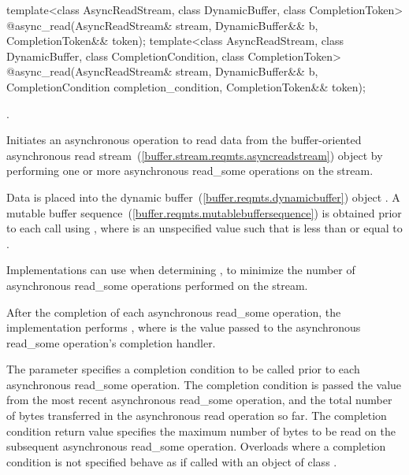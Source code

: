 %
\begin{itemdecl}
template<class AsyncReadStream, class DynamicBuffer, class CompletionToken>
    @\DEDUCED@ async_read(AsyncReadStream& stream,
                       DynamicBuffer&& b, CompletionToken&& token);
template<class AsyncReadStream, class DynamicBuffer, class CompletionCondition,
         class CompletionToken>
    @\DEDUCED@ async_read(AsyncReadStream& stream,
                       DynamicBuffer&& b,
                       CompletionCondition completion_condition,
                       CompletionToken&& token);
\end{itemdecl}

\begin{itemdescr}
\pnum
\completionsig {}.

\pnum
\effects Initiates an asynchronous operation to read data from the buffer-oriented asynchronous read stream~(\ref{buffer.stream.reqmts.asyncreadstream}) object  by performing one or more asynchronous read_some operations on the stream.

\pnum
Data is placed into the dynamic buffer~(\ref{buffer.reqmts.dynamicbuffer}) object . A mutable buffer sequence~(\ref{buffer.reqmts.mutablebuffersequence}) is obtained prior to each  call using , where  is an unspecified value such that  is less than or equal to . \begin{note} Implementations can use  when determining , to minimize the number of asynchronous read_some operations performed on the stream. \end{note} After the completion of each asynchronous read_some operation, the implementation performs , where  is the value passed to the asynchronous read_some operation's completion handler.

\pnum
The  parameter specifies a completion condition to be called prior to each asynchronous read_some operation. The completion condition is passed the  value from the most recent asynchronous read_some operation, and the total number of bytes transferred in the asynchronous read operation so far. The completion condition return value specifies the maximum number of bytes to be read on the subsequent asynchronous read_some operation. Overloads where a completion condition is not specified behave as if called with an object of class .


\end{itemdescr}
